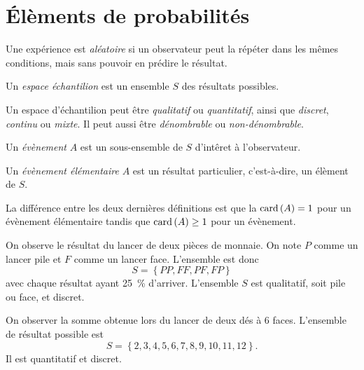 \documentclass[11pt]{article}
\newcommand\card{%
	\ensuremath{%
		\mathrm{card}\,%
	}%
}%
\begin{document}
\tableofcontents
\pagebreak

\section{Élèments de probabilités}
\begin{definition}
	Une expérience est \textit{aléatoire} si un observateur peut la répéter
	dans les mêmes conditions, mais sans pouvoir en prédire le résultat.
\end{definition}

\begin{definition}
	Un \textit{espace échantilion} est un ensemble $S$ des résultats possibles.
\end{definition}

Un espace d'échantilion peut être \textit{qualitatif} ou \textit{quantitatif},
ainsi que \textit{discret}, \textit{continu} ou \textit{mixte}. Il peut aussi
être \textit{dénombrable} ou \textit{non-dénombrable}.

\begin{definition}
	Un \textit{évènement} $A$ est un sous-ensemble de $S$ d'intêret à
	l'observateur.
\end{definition}

\begin{definition}
	Un \textit{évènement élémentaire} $A$ est un résultat particulier,
	c'est-à-dire, un élèment de $S$.
\end{definition}

La différence entre les deux dernières définitions est que la $\card(A)=1$ pour
un évènement élémentaire tandis que $\card(A)\geq 1$ pour un évènement.

\begin{exemple}
	On observe le résultat du lancer de deux pièces de monnaie. On note $P$
	comme un lancer pile et $F$ comme un lancer face. L'ensemble est donc
	\begin{equation*}
		S=\left\{PP, FF, PF, FP\right\}
	\end{equation*}
	avec chaque résultat ayant \SI{25}{\percent} d'arriver. L'ensemble $S$ est
	qualitatif, soit pile ou face, et discret.
\end{exemple}

\begin{exemple}
	On observer la somme obtenue lors du lancer de deux dés à 6 faces.
	L'ensemble de résultat possible est
	\begin{equation*}
		S=\left\{2,3,4,5,6,7,8,9,10,11,12\right\}.
	\end{equation*}
	Il est quantitatif et discret.
\end{exemple}
\end{document}
